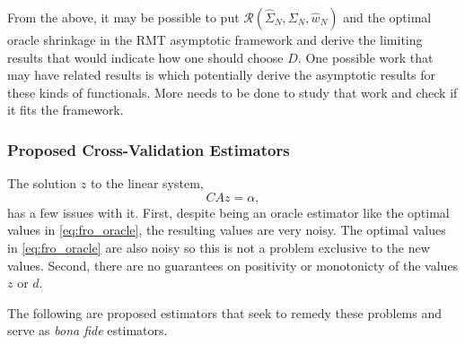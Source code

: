 \documentclass{article}
\begin{document}
From the above, it may be possible to put $\mathcal{R}(\hat{\Sigma}_N,
\Sigma_N, \hat{w}_N)$ and the optimal oracle shrinkage in the RMT asymptotic
framework and derive the limiting results that would indicate how one should
choose $D$.  One possible work that may have related results is
\cite{Mestre2008Improved} which potentially derive the asymptotic results for
these kinds of functionals.  More needs to be done to study that work and check
if it fits the framework.

\subsubsection{Proposed Cross-Validation Estimators}

The solution $z$ to the linear system,
$$
	C A z = \alpha,
$$
has a few issues with it.  First, despite being an oracle estimator like the
optimal values in \eqref{eq:fro_oracle}, the resulting values are very noisy.
The optimal values in \eqref{eq:fro_oracle} are also noisy so this is not a
problem exclusive to the new values.  Second, there are no guarantees on
positivity or monotonicty of the values $z$ or $d$.

The following are proposed estimators that seek to remedy these problems and
serve as \emph{bona fide} estimators.
\end{document}
